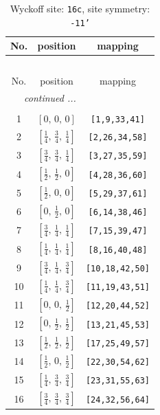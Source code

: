 \documentclass[fleqn,8pt]{jsarticle}
\begin{document}
\begin{longtable}{ccc}
\caption{Wyckoff site: {\tt 16c}, site symmetry: {\tt -11'}}
 \\
 \hline \hline
No. & position & mapping \\ \hline \endfirsthead

\multicolumn{2}{l}{\tablename\ \thetable{}} \\
 \hline \hline
No. & position & mapping \\ \hline \endhead

 \hline \hline
\multicolumn{2}{r}{\footnotesize\it continued ...} \\ \endfoot

 \hline \hline
\multicolumn{2}{r}{} \\ \endlastfoot

1 & $\left[ 0,\, 0,\, 0 \right]$ & {\tt [1,9,33,41]} \\ \hline
2 & $\left[ \frac{1}{4},\, \frac{3}{4},\, \frac{1}{4} \right]$ & {\tt [2,26,34,58]} \\ \hline
3 & $\left[ \frac{3}{4},\, \frac{3}{4},\, \frac{1}{4} \right]$ & {\tt [3,27,35,59]} \\ \hline
4 & $\left[ \frac{1}{2},\, \frac{1}{2},\, 0 \right]$ & {\tt [4,28,36,60]} \\ \hline
5 & $\left[ \frac{1}{2},\, 0,\, 0 \right]$ & {\tt [5,29,37,61]} \\ \hline
6 & $\left[ 0,\, \frac{1}{2},\, 0 \right]$ & {\tt [6,14,38,46]} \\ \hline
7 & $\left[ \frac{3}{4},\, \frac{1}{4},\, \frac{1}{4} \right]$ & {\tt [7,15,39,47]} \\ \hline
8 & $\left[ \frac{1}{4},\, \frac{1}{4},\, \frac{1}{4} \right]$ & {\tt [8,16,40,48]} \\ \hline
9 & $\left[ \frac{3}{4},\, \frac{1}{4},\, \frac{3}{4} \right]$ & {\tt [10,18,42,50]} \\ \hline
10 & $\left[ \frac{1}{4},\, \frac{1}{4},\, \frac{3}{4} \right]$ & {\tt [11,19,43,51]} \\ \hline
11 & $\left[ 0,\, 0,\, \frac{1}{2} \right]$ & {\tt [12,20,44,52]} \\ \hline
12 & $\left[ 0,\, \frac{1}{2},\, \frac{1}{2} \right]$ & {\tt [13,21,45,53]} \\ \hline
13 & $\left[ \frac{1}{2},\, \frac{1}{2},\, \frac{1}{2} \right]$ & {\tt [17,25,49,57]} \\ \hline
14 & $\left[ \frac{1}{2},\, 0,\, \frac{1}{2} \right]$ & {\tt [22,30,54,62]} \\ \hline
15 & $\left[ \frac{1}{4},\, \frac{3}{4},\, \frac{3}{4} \right]$ & {\tt [23,31,55,63]} \\ \hline
16 & $\left[ \frac{3}{4},\, \frac{3}{4},\, \frac{3}{4} \right]$ & {\tt [24,32,56,64]} \\
\end{longtable}
\end{document}
